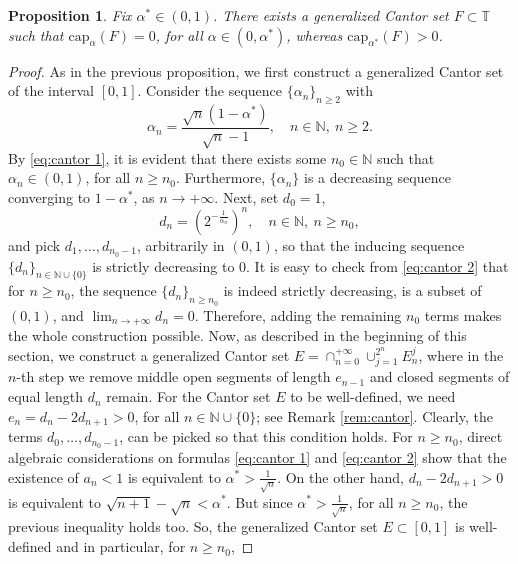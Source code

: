 \documentclass[12pt]{amsart}
\newtheorem{proposition}[theorem]{Proposition}
\theoremstyle{definition}\newtheorem{remark}[theorem]{Remark}
\theoremstyle{definition}\newtheorem{example}[theorem]{Example}
\theoremstyle{definition}\newtheorem{definition}{Definition}
\numberwithin{equation}{section}
\newcommand\TT{{\mathbb T}}
\begin{document}
\begin{proposition}\label{construction Cantor 2}
Fix $\alpha^*\in (0,1)$. There exists a generalized Cantor set $F\subset \TT$ such that $\mathrm{cap}_\alpha(F)=0$, for all $\alpha\in (0,\alpha^*)$, whereas $\mathrm{cap}_{\alpha^*}(F)>0$.
\end{proposition}
\begin{proof}
As in the previous proposition, we first construct a generalized Cantor set of the interval $[0,1]$. Consider the sequence $\{\alpha_n\}_{n\ge2}$ with 
    \begin{equation}\label{eq:cantor 1}
        \alpha_n=\frac{\sqrt{n}(1-\alpha^*)}{\sqrt{n}-1}, \quad n\in\mathbb{N},\ n\ge2.
    \end{equation}
    By \eqref{eq:cantor 1}, it is evident that there exists some $n_0\in\mathbb{N}$ such that $\alpha_n\in(0,1)$, for all $n\ge n_0$. Furthermore, $\{\alpha_n\}$ is a decreasing sequence converging to $1-\alpha^*$, as $n\to+\infty$. Next, set $d_0=1$,
    \begin{equation}\label{eq:cantor 2}
        d_n=\left(2^{-\frac{1}{\alpha_n}}\right)^n, \quad n\in\mathbb{N}, \ n\ge n_0,
    \end{equation}
    and pick $d_1,\dots,d_{n_0-1}$, arbitrarily in $(0,1)$, so that the inducing sequence $\{d_n\}_{n\in\mathbb{N}\cup\{0\}}$ is strictly decreasing to $0$. It is easy to check from \eqref{eq:cantor 2} that for $n\ge n_0$, the sequence $\{d_n\}_{n\ge n_0}$ is indeed strictly decreasing, is a subset of $(0,1)$, and $\lim_{n\to+\infty}d_n=0$. Therefore, adding the remaining $n_0$ terms makes the whole construction possible. Now, as described in the beginning of this section, we construct a generalized Cantor set $E=\cap_{n=0}^{+\infty}\cup_{j=1}^{2^n}E_n^j$, where in the $n$-th step we remove middle open segments of length $e_{n-1}$ and closed segments of equal length $d_n$ remain. For the Cantor set $E$ to be well-defined, we need $e_n=d_n-2d_{n+1}>0$, for all $n\in\mathbb{N}\cup\{0\}$; see Remark \ref{rem:cantor}. Clearly, the terms $d_0,\dots,d_{n_0-1}$, can be picked so that this condition holds. For $n\ge n_0$, direct algebraic considerations on formulas \eqref{eq:cantor 1} and \eqref{eq:cantor 2} show that the existence of $a_n<1$ is equivalent to $\alpha^*>\frac{1}{\sqrt{n}}$. On the other hand, $d_n-2d_{n+1}>0$ is equivalent to $\sqrt{n+1}-\sqrt{n}<\alpha^*.$ But since $\alpha^*>\frac{1}{\sqrt{n}}$, for all $n\ge n_0$, the previous inequality holds too. So, the generalized Cantor set $E\subset[0,1]$ is well-defined and in particular, for $n\ge n_0$,

\end{proof}
\end{document}

